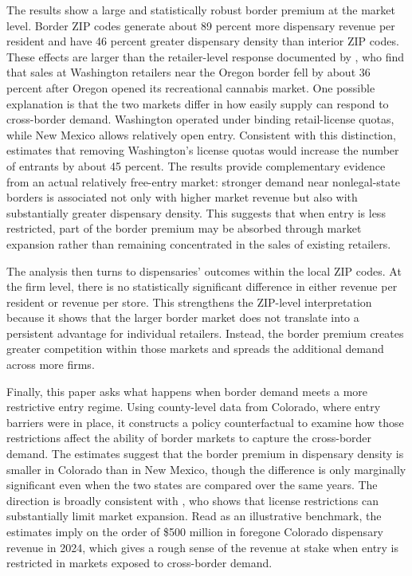 \documentclass[english,12pt]{article}
\begin{document}
The results show a large and statistically robust border premium at the market level. Border ZIP codes generate about 89 percent more dispensary revenue per resident and have 46 percent greater dispensary density than interior ZIP codes. These effects are larger than the retailer-level response documented by \cite{HansenMillerWeber2020}, who find that sales at Washington retailers near the Oregon border fell by about 36 percent after Oregon opened its recreational cannabis market. One possible explanation is that the two markets differ in how easily supply can respond to cross-border demand. Washington operated under binding retail-license quotas, while New Mexico allows relatively open entry. Consistent with this distinction, \cite{thomas2019license} estimates that removing Washington's license quotas would increase the number of entrants by about 45 percent. The results provide complementary evidence from an actual relatively free-entry market: stronger demand near nonlegal-state borders is associated not only with higher market revenue but also with substantially greater dispensary density. This suggests that when entry is less restricted, part of the border premium may be absorbed through market expansion rather than remaining concentrated in the sales of existing retailers.


The analysis then turns to dispensaries' outcomes within the local ZIP codes. At the firm level, there is no statistically significant difference in either revenue per resident or revenue per store. This strengthens the ZIP-level interpretation because it shows that the larger border market does not translate into a persistent advantage for individual retailers. Instead, the border premium creates greater competition within those markets and spreads the additional demand across more firms.

Finally, this paper asks what happens when border demand meets a more restrictive entry regime. Using county-level data from Colorado, where entry barriers were in place, it constructs a policy counterfactual to examine how those restrictions affect the ability of border markets to capture the cross-border demand. The estimates suggest that the border premium in dispensary density is smaller in Colorado than in New Mexico, though the difference is only marginally significant even when the two states are compared over the same years. The direction is broadly consistent with \cite{thomas2019license}, who shows that license restrictions can substantially limit market expansion. Read as an illustrative benchmark, the estimates imply on the order of \$500 million in foregone Colorado dispensary revenue in 2024, which gives a rough sense of the revenue at stake when entry is restricted in markets exposed to cross-border demand.
\end{document}
